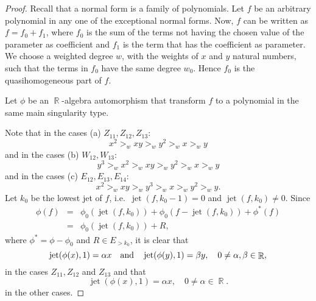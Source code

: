 \documentclass[noend]{amsproc}
\theoremstyle{definition}
\DeclareMathOperator{\jet}{jet}
\DeclareMathOperator{\R}{\mathbb{R}}
\begin{document}
\begin{proof}
Recall that a normal form is a family of polynomials. Let $f$ be an arbitrary polynomial in any one of the exceptional normal forms. Now, $f$ can be written as $f=f_0+f_1$, where $f_0$ is the sum of the terms not having the chosen value of the parameter as coefficient and $f_1$ is the term that has the coefficient as parameter. We choose a weighted degree $w$, with the weights of $x$ and $y$ natural numbers, such that the terms in $f_0$ have the same degree $w_0$. Hence $f_0$ is the quasihomogeneous part of $f$.

Let $\phi$ be an $\R$-algebra automorphism that transform $f$ to a polynomial in the same main singularity type.

Note that in the cases (a) $Z_{11}, Z_{12}, Z_{13}$:
\begin{equation}\label{a}
x^2>_w xy>_w y^2>_w x>_w y
\end{equation} 
and in the cases (b)  $W_{12}, W_{13}$:
\begin{equation}\label{b}
y^3>_wx^2>_w xy>_w y^2>_w x>_w y
\end{equation} 
and in the cases (c) $E_{12}, E_{13}, E_{14}$:
\begin{equation}\label{c}
x^2>_w xy >_w y^3>_w x>_w y^2>_w y.
\end{equation}
Let $k_0$ be the lowest jet of $f$, i.e.~$\jet(f,k_0-1)=0$ and $\jet(f,k_0)\neq 0$. Since 
\begin{eqnarray*}
\phi(f) &=& \phi_0(\jet(f,k_0))+\phi_0(f-\jet(f,k_0))+\phi^*(f)\nonumber\\
 &=& \phi_0(\jet(f,k_0))+R,\label{lowestjet}
\end{eqnarray*}
where $\phi^*=\phi-\phi_0$ and $R\in E_{>k_0}$, it is clear that
\begin{equation}\label{transxy}
\jet(\phi(x),1)=\alpha x\quad\textnormal{and}\quad\jet(\phi(y),1)=\beta y,\quad 0\neq\alpha,\beta\in\R,
\end{equation}
in the cases $Z_{11}, Z_{12}$ and $Z_{13}$ and that
\begin{equation}
\jet(\phi(x),1)=\alpha x,\quad 0\neq\alpha\in\R.\label{transx}
\end{equation}
in the other cases.


\end{proof}
\end{document}
